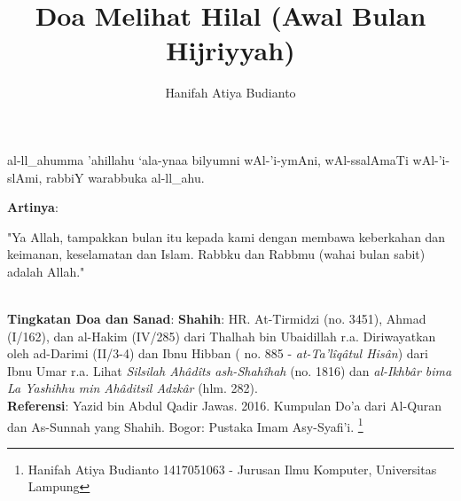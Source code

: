 \documentclass[a4paper,12pt]{article}
\title{\Large Doa Melihat Hilal (Awal Bulan Hijriyyah)}
\author{\calligra Hanifah Atiya Budianto}
\begin{document}
\sffamily
\maketitle 
\fullvocalize
{}
\begin{arabtext}
\noindent
al-ll_ahumma 'ahillahu `ala-ynaa bilyumni wAl-'i-ymAni, wAl-ssalAmaTi 
wAl-'i-slAmi, rabbiY warabbuka al-ll_ahu.\\
\end{arabtext}
\noindent
\textbf{Artinya}:
\par
\indent
"Ya Allah, tampakkan bulan itu kepada kami dengan membawa keberkahan dan 
keimanan, keselamatan dan Islam. Rabbku dan Rabbmu (wahai bulan sabit) 
adalah Allah."\\\\
\par
\noindent
\textbf{Tingkatan Doa dan Sanad}: \textbf{Shahih}: HR. At-Tirmidzi (no. 
3451), Ahmad (I/162), dan al-Hakim (IV/285) dari Thalhah bin Ubaidillah 
r.a. Diriwayatkan oleh ad-Darimi (II/3-4) dan Ibnu Hibban ( no. 885 -
\textit{at-Ta'l\^{i}q\^{a}tul His\^{a}n}) dari Ibnu Umar r.a. Lihat 
\textit{Silsilah Ah\^{a}d\^{i}ts ash-Shah\^{i}hah} (no. 1816) dan 
\textit{al-Ikhb\^{a}r bima La Yashihhu min Ah\^{a}ditsil Adzk\^{a}r} 
(hlm. 282).\\
\textbf{Referensi}: Yazid bin Abdul Qadir Jawas. 2016. Kumpulan Do'a dari
Al-Quran dan As-Sunnah yang Shahih. Bogor: Pustaka Imam Asy-Syafi'i.
\footnote{Hanifah Atiya Budianto 1417051063 - Jurusan Ilmu Komputer,
Universitas Lampung}
\end{document}
